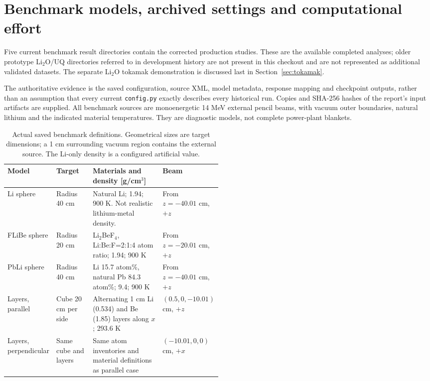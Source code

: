 \section{Benchmark models, archived settings and computational effort}
\label{sec:models}
Five current benchmark result directories contain the corrected production studies. These are the available completed analyses; older prototype Li$_2$O/UQ directories referred to in development history are not present in this checkout and are not represented as additional validated datasets. The separate Li$_2$O tokamak demonstration is discussed last in Section~\ref{sec:tokamak}.

The authoritative evidence is the saved configuration, source XML, model metadata, response mapping and checkpoint outputs, rather than an assumption that every current \texttt{config.py} exactly describes every historical run. Copies and SHA-256 hashes of the report's input artifacts are supplied. All benchmark sources are monoenergetic 14 MeV external pencil beams, with vacuum outer boundaries, natural lithium and the indicated material temperatures. They are diagnostic models, not complete power-plant blankets.

\begin{table}[tbp]\centering\small
\caption{Actual saved benchmark definitions. Geometrical sizes are target dimensions; a 1 cm surrounding vacuum region contains the external source. The Li-only density is a configured artificial value.}
\begin{tabularx}{\linewidth}{p{0.16\linewidth}p{0.17\linewidth}X p{0.17\linewidth}}
\toprule Model & Target & Materials and density [g/cm$^3$] & Beam\\\midrule
Li sphere & Radius 40 cm & Natural Li; 1.94; 900 K. Not realistic lithium-metal density. & From $z=-40.01$ cm, $+z$\\
FLiBe sphere & Radius 20 cm & Li$_2$BeF$_4$, Li:Be:F=2:1:4 atom ratio; 1.94; 900 K & From $z=-20.01$ cm, $+z$\\
PbLi sphere & Radius 40 cm & Li 15.7 atom\%, natural Pb 84.3 atom\%; 9.4; 900 K & From $z=-40.01$ cm, $+z$\\
Layers, parallel & Cube 20 cm per side & Alternating 1 cm Li (0.534) and Be (1.85) layers along $x$; 293.6 K & $(0.5,0,-10.01)$ cm, $+z$\\
Layers, perpendicular & Same cube and layers & Same atom inventories and material definitions as parallel case & $(-10.01,0,0)$ cm, $+x$\\
\bottomrule
\end{tabularx}\end{table}

